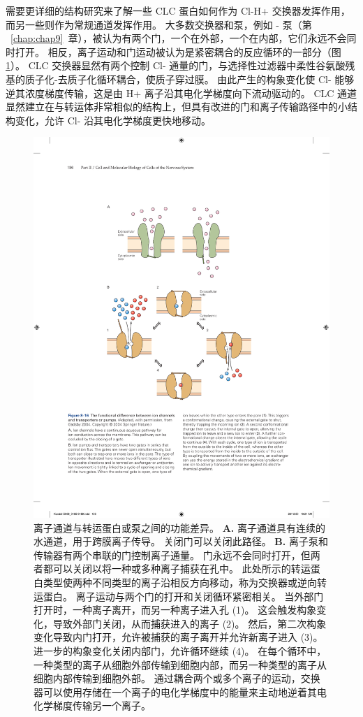 需要更详细的结构研究来了解一些 CLC 蛋白如何作为 Cl-H+ 交换器发挥作用，而另一些则作为常规通道发挥作用。
大多数交换器和泵，例如 - 泵（第 ~\ref{chap:chap9}~章），被认为有两个门，一个在外部，一个在内部，它们永远不会同时打开。
相反，离子运动和门运动被认为是紧密耦合的反应循环的一部分（图\ref{fig:8_16}）。
CLC 交换器显然有两个控制 Cl- 通量的门，与选择性过滤器中柔性谷氨酸残基的质子化-去质子化循环耦合，使质子穿过膜。
由此产生的构象变化使 Cl- 能够逆其浓度梯度传输，这是由 H+ 离子沿其电化学梯度向下流动驱动的。
CLC 通道显然建立在与转运体非常相似的结构上，但具有改进的门和离子传输路径中的小结构变化，允许 Cl- 沿其电化学梯度更快地移动。


\begin{figure}[htbp]
	\centering
	\includegraphics[width=0.6\linewidth]{chap08/fig_8_16}
	\caption{离子通道与转运蛋白或泵之间的功能差异\cite{gadsby2004spot}。 
		\textbf{A.} 离子通道具有连续的水通道，用于跨膜离子传导。
		关闭门可以关闭此路径。
		\textbf{B.} 离子泵和传输器有两个串联的门控制离子通量。
		门永远不会同时打开，但两者都可以关闭以将一种或多种离子捕获在孔中。
		此处所示的转运蛋白类型使两种不同类型的离子沿相反方向移动，称为交换器或逆向转运蛋白。
		离子运动与两个门的打开和关闭循环紧密相关。
		当外部门打开时，一种离子离开，而另一种离子进入孔 (1)。
		这会触发构象变化，导致外部门关闭，从而捕获进入的离子 (2)。
		然后，第二次构象变化导致内门打开，允许被捕获的离子离开并允许新离子进入 (3)。
		进一步的构象变化关闭内部门，允许循环继续 (4)。
		在每个循环中，一种类型的离子从细胞外部传输到细胞内部，而另一种类型的离子从细胞内部传输到细胞外部。
		通过耦合两个或多个离子的运动，交换器可以使用存储在一个离子的电化学梯度中的能量来主动地逆着其电化学梯度传输另一个离子。}
	\label{fig:8_16}
\end{figure}



